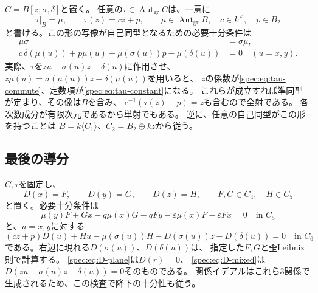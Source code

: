 \documentclass[11pt,a4paper]{ltjsarticle}
\theoremstyle{definition}
\newcommand{\Aut}{\operatorname{Aut}}
\begin{document}
$C=B[z;\sigma,\delta]$と置く。
任意の$\tau\in\Aut_{\mathrm{gr}}C$は、一意に
\begin{equation}\label{spec:eq:tau-form}
\tau|_B=\mu,\qquad \tau(z)=cz+p,\qquad
\mu\in\Aut_{\mathrm{gr}}B,\quad c\in k^\times,\quad p\in B_2
\end{equation}
と書ける。この形の写像が自己同型となるための必要十分条件は
\begin{align}
\mu\sigma&=\sigma\mu,\label{spec:eq:tau-commute}\\
c\,\delta(\mu(u))+p\mu(u)
-\mu(\sigma(u))p-\mu(\delta(u))&=0
\quad(u=x,y).\label{spec:eq:tau-constant}
\end{align}
実際、$\tau$を$zu-\sigma(u)z-\delta(u)$に作用させ、
$z\mu(u)=\sigma(\mu(u))z+\delta(\mu(u))$を用いると、
$z$の係数が\eqref{spec:eq:tau-commute}、定数項が\eqref{spec:eq:tau-constant}になる。
これらが成立すれば準同型が定まり、その像は$B$を含み、
$c^{-1}(\tau(z)-p)=z$も含むので全射である。
各次数成分が有限次元であるから単射でもある。
逆に、任意の自己同型がこの形を持つことは
$B=k\langle C_1\rangle$、$C_2=B_2\oplus kz$から従う。

\subsection{最後の導分}
$C,\tau$を固定し、
\[
D(x)=F,\qquad D(y)=G,\qquad D(z)=H,\qquad
F,G\in C_4,\quad H\in C_5
\]
と置く。必要十分条件は
\begin{equation}\label{spec:eq:D-plane}
\mu(y)F+Gx-q\mu(x)G-qFy
-\varepsilon\mu(x)F-\varepsilon Fx=0\quad\text{in }C_5
\end{equation}
と、$u=x,y$に対する
\begin{equation}\label{spec:eq:D-mixed}
(cz+p)D(u)+Hu-\mu(\sigma(u))H
-D(\sigma(u))z-D(\delta(u))=0\quad\text{in }C_6
\end{equation}
である。右辺に現れる$D(\sigma(u))$、$D(\delta(u))$は、
指定した$F,G$と歪Leibniz則で計算する。
\eqref{spec:eq:D-plane}は$D(r)=0$、
\eqref{spec:eq:D-mixed}は$D(zu-\sigma(u)z-\delta(u))=0$そのものである。
関係イデアルはこれら3関係で生成されるため、この検査で降下の十分性も従う。
\end{document}
